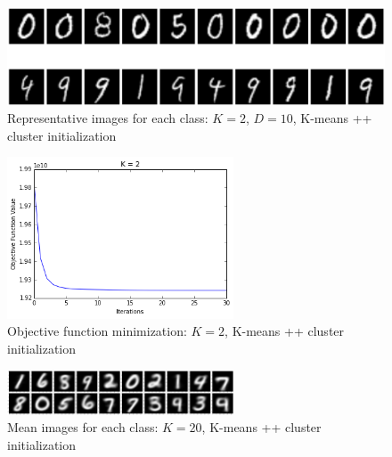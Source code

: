 \documentclass[submit]{harvardml}
\begin{document}
\begin{figure}
	\centering
	\includegraphics[width=1.0\textwidth]{output_5_1.png}
	\caption{Representative images for each class: $K = 2$, $D = 10$, K-means ++ cluster initialization }
\end{figure}

\begin{figure}
	\centering
	\includegraphics[width=0.6\textwidth]{output_6_0.png}
	\caption{Objective function minimization: $K = 2$, K-means ++ cluster initialization }
\end{figure}

%

\begin{figure}
	\centering
	\includegraphics[width=0.6\textwidth]{output_8_0.png}
	\caption{Mean images for each class: $K = 20$, K-means ++ cluster initialization }
\end{figure}
\end{document}
